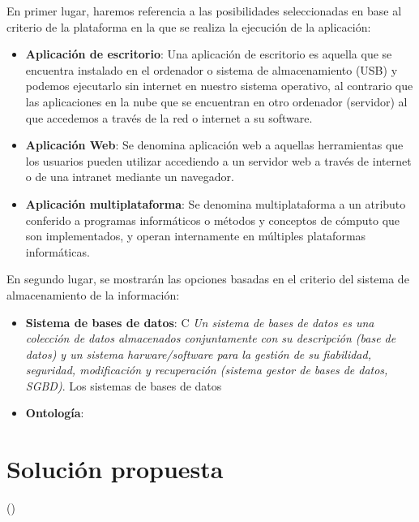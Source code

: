 En primer lugar, haremos referencia a las posibilidades seleccionadas en base al criterio de la plataforma en la que 
se realiza la ejecución de la aplicación: 
\begin{itemize}
    \item \textbf{Aplicación de escritorio}: Una aplicación de escritorio es aquella que se encuentra instalado en el 
    ordenador o sistema de almacenamiento (USB) y podemos ejecutarlo sin internet en nuestro sistema operativo, 
    al contrario que las aplicaciones en la nube que se encuentran en otro ordenador (servidor) al que accedemos 
    a través de la red o internet a su software.

    \item \textbf{Aplicación Web}: Se denomina aplicación web a aquellas herramientas que los usuarios pueden utilizar 
    accediendo a un servidor web a través de internet o de una intranet mediante un navegador.

    \item \textbf{Aplicación multiplataforma}: Se denomina multiplataforma a un atributo conferido a programas informáticos 
    o métodos y conceptos de cómputo que son implementados, y operan internamente en múltiples plataformas informáticas.

\end{itemize}

En segundo lugar, se mostrarán las opciones basadas en el criterio del sistema de almacenamiento de la información:
\begin{itemize}
    \item \textbf{Sistema de bases de datos}: C \textit{Un sistema de bases de datos es una colección de datos almacenados conjuntamente
    con su descripción \textnormal{(base de datos)} y un sistema harware/software para la gestión de su fiabilidad, seguridad, 
    modificación y recuperación \textnormal{{(sistema gestor de bases de datos, SGBD)}}}. Los sistemas de bases de datos
    \item \textbf{Ontología}:
\end{itemize}


\section{Solución propuesta}
\lorem()

